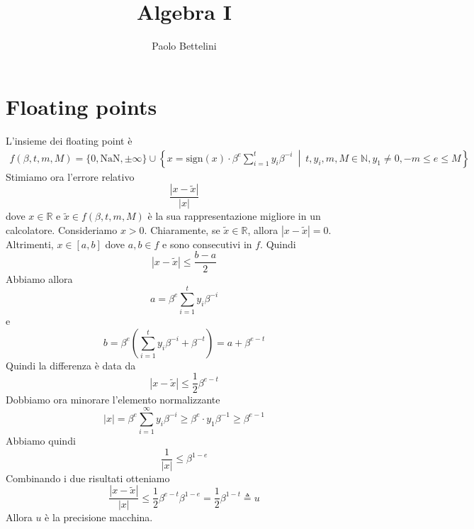 \documentclass[a4paper]{article}
\title{Algebra I}
\author{Paolo Bettelini}
\date{}
\begin{document}
\maketitle
\tableofcontents

\section{Floating points}

L'insieme dei floating point è
\begin{align*}
    f(\beta, t, m, M) = \{0, \text{NaN}, \pm\infty\} \cup
    \left\{x = \text{sign}(x) \cdot \beta^e \sum_{i=1}^t y_i \beta^{-i} \ \middle|\ 
    t,y_i,m,M \in \mathbb{N}, y_1 \neq 0, -m\leq e \leq M \right\}
\end{align*}
Stimiamo ora l'errore relativo
\[
    \frac{|x-\tilde x|}{|x|}
\]
dove \(x\in\mathbb{R}\) e \(\tilde x \in f(\beta, t, m, M)\) è la sua rappresentazione migliore in un calcolatore.
Consideriamo \(x > 0\).
Chiaramente, se \(\tilde x \in \mathbb{R}\), allora \(|x-\tilde x| = 0\).
Altrimenti, \(x\in [a,b]\) dove \(a,b\in f\) e sono consecutivi in \(f\).
Quindi
\[
    |x-\tilde x| \leq \frac{b-a}{2}
\]
Abbiamo allora
\[
    a = \beta^e \sum_{i=1}^t y_i \beta^{-i}
\]
e
\[
    b = \beta^e \left( \sum_{i=1}^t y_i \beta^{-i} + \beta^{-t} \right)
    = a + \beta^{e - t}
\]
Quindi la differenza è data da
\[
    |x - \tilde x| \leq \frac{1}{2}\beta^{e-t}
\]
Dobbiamo ora minorare l'elemento normalizzante
\[
    |x| = \beta^e \sum_{i=1}^\infty y_i\beta^{-i} \geq \beta^e \cdot y_1 \beta^{-1} \geq \beta^{e-1}
\]
Abbiamo quindi
\[
    \frac{1}{|x|} \leq \beta^{1-e}
\]
Combinando i due risultati otteniamo
\[
    \frac{|x-\tilde x|}{|x|} \leq \frac{1}{2}\beta^{e-t} \beta^{1-e}
    = \frac{1}{2} \beta^{1-t} \triangleq u
\]
Allora \(u\) è la precisione macchina.
\end{document}

